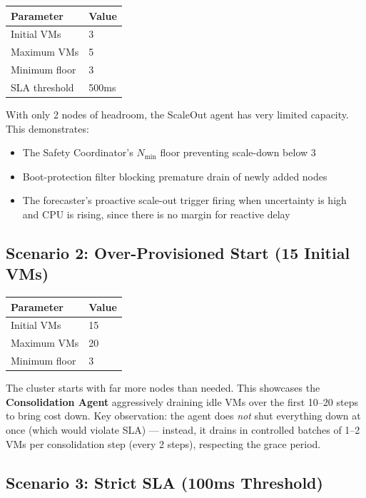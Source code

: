 \documentclass[11pt,a4paper]{article}
\begin{document}
\begin{center}
\begin{tabular}{ll}
\toprule
\textbf{Parameter} & \textbf{Value} \\
\midrule
Initial VMs & 3 \\
Maximum VMs & 5 \\
Minimum floor & 3 \\
SLA threshold & 500ms \\
\bottomrule
\end{tabular}
\end{center}

With only 2 nodes of headroom, the ScaleOut agent has very limited capacity.
This demonstrates:
\begin{itemize}[leftmargin=2em]
  \item The Safety Coordinator's $N_{\min}$ floor preventing scale-down below 3
  \item Boot-protection filter blocking premature drain of newly added nodes
  \item The forecaster's proactive scale-out trigger firing when uncertainty is
        high and CPU is rising, since there is no margin for reactive delay
\end{itemize}

\subsection{Scenario 2: Over-Provisioned Start (15 Initial VMs)}

\begin{center}
\begin{tabular}{ll}
\toprule
\textbf{Parameter} & \textbf{Value} \\
\midrule
Initial VMs & 15 \\
Maximum VMs & 20 \\
Minimum floor & 3 \\
\bottomrule
\end{tabular}
\end{center}

The cluster starts with far more nodes than needed. This showcases the
\textbf{Consolidation Agent} aggressively draining idle VMs over the first
10--20 steps to bring cost down. Key observation: the agent does \textit{not}
shut everything down at once (which would violate SLA) --- instead, it drains
in controlled batches of 1--2 VMs per consolidation step (every 2 steps),
respecting the grace period.

\subsection{Scenario 3: Strict SLA (100ms Threshold)}
\end{document}

